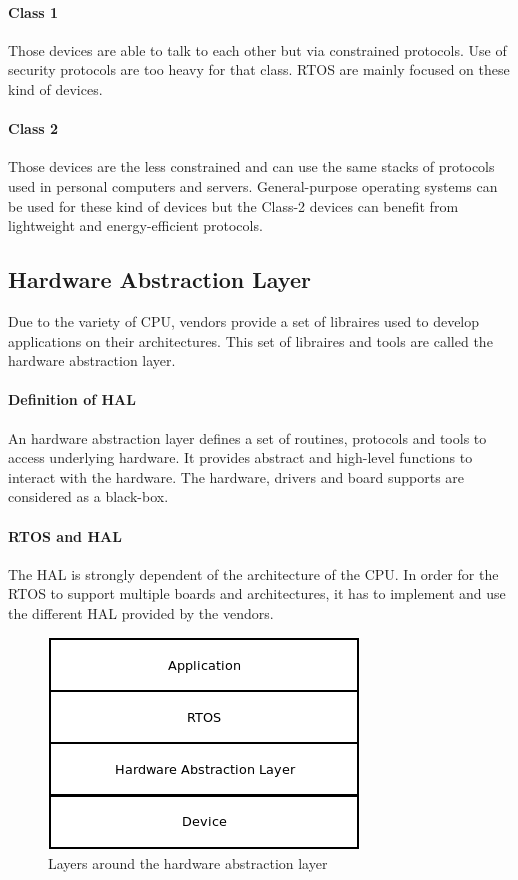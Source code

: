 \paragraph{Class 1}
Those devices are able to talk to each other but via constrained protocols.
Use of security protocols are too heavy for that class.
RTOS are mainly focused on these kind of devices.

\paragraph{Class 2}
Those devices are the less constrained and can use the same stacks of protocols used in personal computers and servers.
General-purpose operating systems can be used for these kind of devices but the Class-2 devices can benefit from lightweight and energy-efficient protocols.

\subsection{Hardware Abstraction Layer}

Due to the variety of CPU, vendors provide a set of libraires used to develop applications on their architectures.
This set of libraires and tools are called the hardware abstraction layer.

\paragraph{Definition of HAL}
An hardware abstraction layer defines a set of routines, protocols and tools to access underlying hardware.
It provides abstract and high-level functions to interact with the hardware.
The hardware, drivers and board supports are considered as a black-box.

\paragraph{RTOS and HAL}
The HAL is strongly dependent of the architecture of the CPU.
In order for the RTOS to support multiple boards and architectures, it has to implement and use the different HAL provided by the vendors.

\begin{figure}[!h]
  \centering
  \includegraphics[scale=0.7]{assets/hal-layers.png}
  \caption{\label{fig:hal-layer}Layers around the hardware abstraction layer}
\end{figure}

